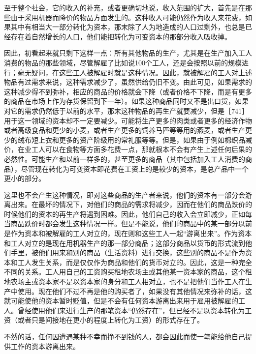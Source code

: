 至于整个社会，它的收入的补充，或者更确切地说，收入范围的扩大，首先是在那些由于采用机器而降价的物品方面发生的。这种收入可能仍然作为收入来花费，如果其中有相当大一部分转化为资本，那末除了人为地造成的人口过剩外，也总是已经存在着自然增长的人口，他们能把转化为可变资本的那部分收入吸收掉。

因此，初看起来就只剩下这样一点：所有其他物品的生产，尤其是在生产加入工人消费的物品的那些领域，尽管解雇了比如说100个工人，还是会按照以前的规模进行；毫无疑问，在这些工人被解雇时就是这种情况。因此，就被解雇的工人对上述物品有过需求来说，这种需求减少了，虽然供给仍旧不变。由此可见，如果需求的这种减少得不到弥补，相应的商品的价格就会下降（或者价格不下降，而是有更多的商品在市场上作为存货保留到下一年）。如果这种商品同时又不是出口货，如果对它的需求仍然低于以前的水平，那末这种物品的再生产就要减少，但是［741］用于这一领域的资本却不一定要减少。可能将生产更多的肉类或者更多的经济作物或者高级食品和更少的小麦，或者生产更多的饲养马匹等等用的燕麦，或者生产更少的绒布短上衣和更多的资产阶级用的常礼服等等。但是，如果由于例如棉织品减价，在业工人可以在食物等方面多花费一点，那就根本不会有产生上述任何后果的必然性。可能生产和以前一样多的，甚至更多的商品（其中包括加入工人消费的商品），尽管现在转化为可变资本即花费在工资上的是较少的资本，是总产品中一个更小的部分。

这里也不会产生这种情况，即对这些商品的生产者来说，他们的资本有一部分会游离出来。在最坏的情况下，对他们的商品的需求将减少，因而在他们的商品跌价的时候他们的资本的再生产将遇到困难。因此，他们自己的收入会立即减少，正如每当商品跌价时都会发生这种情况一样。但是不能说，他们的商品中的某一部分以前是作为资本和被解雇的工人对立的，现在则和这些工人一起“游离出来”。作为资本和工人对立的是现在用机器生产的那一部分商品；这部分商品以货币的形式流到他们手里，被他们用来和别的商品（生活资料）进行交换，这些别的商品不是作为资本和工人发生关系，而是仅仅作为商品和他们的货币对立的。因此，这是一种完全不同的关系。工人用自己的工资购买租地农场主或其他某一资本家的商品，这个租地农场主或资本家不是以资本家的身分和工人相对立，也不是把他们当作工人在生产中使用。现在他们不过不再是他的购买者了，如果没有其他情况来弥补的话，这就可能使他的资本暂时贬值，但是不会有任何资本游离出来用于雇用被解雇的工人。曾经使用他们来进行生产的那笔资本“仍然存在”，但已经不是以资本转化为工资（或者只是间接地在更小的程度上转化为工资）的形式存在了。

不然的话，任何因遭遇某种不幸而挣不到钱的人，都会因此而使一笔能给他自己提供工作的资本游离出来。


